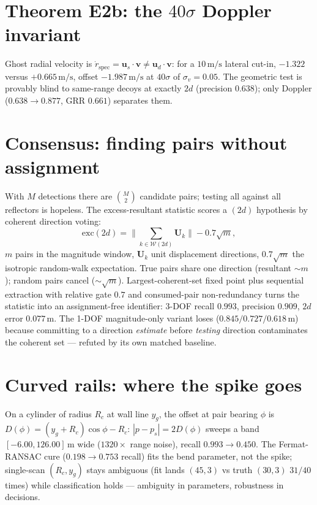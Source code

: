 \documentclass[11pt,oneside]{book}
\begin{document}
\section{Theorem E2b: the $40\sigma$ Doppler invariant}
\label{sec:e2b}

Ghost radial velocity is $\dot r_{\mathrm{spec}}=\mathbf{u}_s\!\cdot\!\mathbf{v}
\neq\mathbf{u}_d\!\cdot\!\mathbf{v}$: for a $10\,\mathrm{m/s}$ lateral
cut-in, $-1.322$ versus $+0.665\,\mathrm{m/s}$, offset $-1.987\,\mathrm{m/s}$
at $40\sigma$ of $\sigma_v=0.05$. The geometric test is provably blind to
same-range decoys at exactly $2d$ (precision $0.638$); only Doppler
($0.638\to0.877$, GRR $0.661$) separates them.

\section{Consensus: finding pairs without assignment}
\label{sec:consensus}

With $M$ detections there are $\binom{M}{2}$ candidate pairs; testing all
against all reflectors is hopeless. The excess-resultant statistic scores a
$(2d)$ hypothesis by coherent direction voting:
\begin{equation}
\mathrm{exc}(2d)=\Big\|\sum_{k\in\mathcal{W}(2d)}\mathbf{U}_k\Big\|-0.7\sqrt{m},
\label{eq:exc}
\end{equation}
$m$ pairs in the magnitude window, $\mathbf{U}_k$ unit displacement
directions, $0.7\sqrt{m}$ the isotropic random-walk expectation. True pairs
share one direction (resultant $\sim m$); random pairs cancel
($\sim\sqrt{m}$). Largest-coherent-set fixed point plus sequential
extraction with relative gate $0.7$ and consumed-pair non-redundancy turns
the statistic into an assignment-free identifier: 3-DOF recall $0.993$,
precision $0.909$, $2d$ error $0.077\,\mathrm{m}$. The 1-DOF
magnitude-only variant loses ($0.845/0.727/0.618\,\mathrm{m}$) because
committing to a direction \emph{estimate} before \emph{testing} direction
contaminates the coherent set --- refuted by its own matched baseline.

\section{Curved rails: where the spike goes}
\label{sec:curved-band}

On a cylinder of radius $R_c$ at wall line $y_g$, the offset at pair bearing
$\phi$ is $D(\phi)=(y_g+R_c)\cos\phi-R_c$: $|p-p_s|=2D(\phi)$ sweeps a band
$[-6.00,126.00]\,\mathrm{m}$ wide ($1320\times$ range noise), recall
$0.993\to0.450$. The Fermat-RANSAC cure ($0.198\to0.753$ recall) fits the
bend parameter, not the spike; single-scan $(R_c,y_g)$ stays ambiguous
(fit lands $(45,3)$ vs truth $(30,3)$ $31/40$ times) while classification
holds --- ambiguity in parameters, robustness in decisions.
\end{document}
